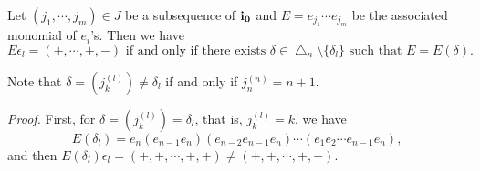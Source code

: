 \begin{lem}\label{tri-ep}
Let $(j_1,{\cdots},j_m)\in J$ be a subsequence of $\bfii0$ 
and $E=e_{j_1}{\cdots} e_{j_m}$ be the associated
monomial of $e_i$'s. Then we have 
\begin{equation}
E{\epsilon}_l=(+,{\cdots},+,-)\text{ if and only if there exists } 
{\delta}\in {\bigtriangleup}_n\setminus\{{\delta}_l\}\text{ such that }
E=E({\delta}).
\end{equation}
\end{lem}
Note that ${\delta}=({j_{k}^{(l)}})\ne{\delta}_l$ if and only if ${j_{n}^{(n)}}=n+1$.

{\noindent}
{\sl Proof.}
First, for ${\delta}=({j_{k}^{(l)}})={\delta}_l$, that is, ${j_{k}^{(l)}}=k$, we have
\[
 E({\delta}_l)=e_n(e_{n-1}e_n)(e_{n-2}e_{n-1}e_n){\cdots}(e_1e_2{\cdots} e_{n-1}e_{n}),
\]
and then 
$E({\delta}_l){\epsilon}_l=(+,+,{\cdots},+,+)\ne(+,+,{\cdots},+,-)$. 

